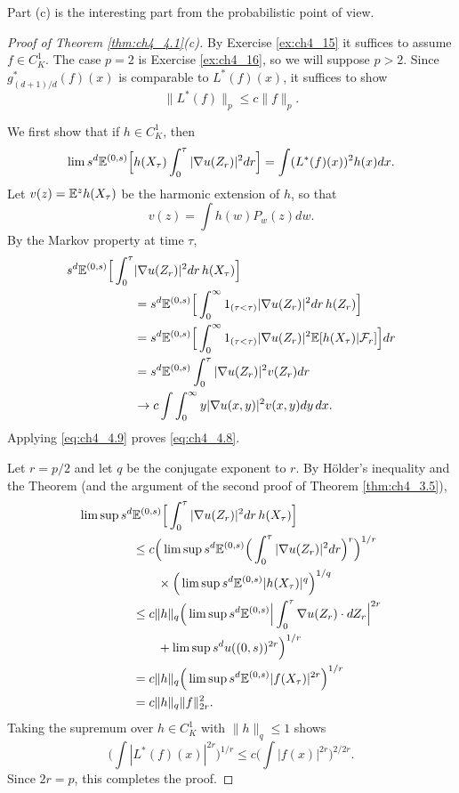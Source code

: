 Part (c) is the interesting part from the probabilistic point of view.

\begin{proof}[Proof of Theorem \ref{thm:ch4_4.1}(c)]
By Exercise \ref{ex:ch4_15} it suffices to assume $f \in C_K^1$. The case $p = 2$ is Exercise \ref{ex:ch4_16}, so we will suppose $p > 2$. Since $g_{(d+1)/d}^*(f)(x)$ is comparable to $L^*(f)(x)$, it suffices to show
\[
    \|L^*(f)\|_p \leq c\|f\|_p.
\]

We first show that if $h \in C_K^1$, then
\begin{equation}\label{eq:ch4_4.8}
    \lim s^d\mathbb{E}^{(0,s)}\Big[h(X_\tau)\int_0^\tau |\nabla u(Z_r)|^2dr\Big] = \int (L^*(f)(x))^2h(x)dx.
\end{equation}
Let $v(z) = \mathbb{E}^zh(X_\tau)$ be the harmonic extension of $h$, so that
\begin{equation}\label{eq:ch4_4.9}
    v(z) = \int h(w)P_w(z)dw.
\end{equation}
\mnewpage
By the Markov property at time $\tau$,
\begin{align*}
    s^d\mathbb{E}^{(0,s)}\Big[\int_0^\tau &|\nabla u(Z_r)|^2dr\,h(X_\tau)\Big] \\
    &= s^d\mathbb{E}^{(0,s)}\Big[\int_0^\infty 1_{(\tau<\tau)}|\nabla u(Z_r)|^2 dr \, h(Z_r)\Big] \\
    &= s^d\mathbb{E}^{(0,s)}\Big[\int_0^\infty 1_{(\tau<\tau)}|\nabla u(Z_r)|^2\mathbb{E}[h(X_\tau)| \mathcal{F}_r]\Big]dr \\
    &= s^d\mathbb{E}^{(0,s)} \int_0^\tau |\nabla u(Z_r)|^2v(Z_r)dr \\
    &\to c \int \int_0^\infty y|\nabla u(x,y)|^2v(x,y)dy\,dx.
\end{align*}
Applying \eqref{eq:ch4_4.9} proves \eqref{eq:ch4_4.8}.

Let $r = p/2$ and let $q$ be the conjugate exponent to $r$. By H\"older's inequality and the Theorem  (and the argument of the second proof of Theorem \ref{thm:ch4_3.5}),
\begin{align*}
    \limsup s^d &\mathbb{E}^{(0,s)}\Big[\int_0^\tau |\nabla u(Z_r)|^2dr\,h(X_\tau)\Big] \\
    &\leq c\Big(\lim \sup s^d\mathbb{E}^{(0,s)} \Big(\int_0^\tau |\nabla u(Z_r)|^2dr\Big)^r\Big)^{1/r} \\
    &\qquad \times \Big(\limsup s^d\mathbb{E}^{(0,s)}|h(X_\tau)|^q\Big)^{1/q} \\
    &\leq c\|h\|_q\Big(\limsup s^d\mathbb{E}^{(0,s)}\Big|\int_0^\tau \nabla u(Z_r)\cdot dZ_r\Big|^{2r}\Big. \\
    &\qquad + \limsup s^du((0,s))^{2r}\Big)^{1/r} \\
    &= c\|h\|_q\Big(\lim \sup s^d\mathbb{E}^{(0,s)}|f(X_\tau)|^{2r}\Big)^{1/r} \\
    &= c\|h\|_q\|f\|_{2r}^2.
\end{align*}
Taking the supremum over $h \in C_K^1$ with $\|h\|_q \leq 1$ shows
\[
    \Big(\int |L^*(f)(x)|^{2r}\Big)^{1/r} \leq c\Big(\int |f(x)|^{2r}\Big)^{2/2r}.
\]
Since $2r = p$, this completes the proof.
\end{proof}

